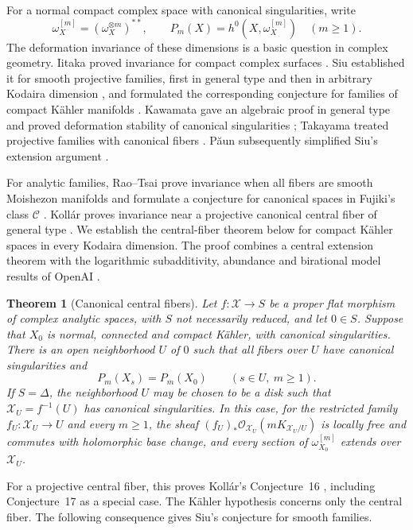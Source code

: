 \documentclass[11pt,a4paper]{article}
\numberwithin{equation}{section}
\newtheorem{maintheorem}{Theorem}
\theoremstyle{definition}
\theoremstyle{remark}
\newcommand{\OO}{\mathcal O}\newcommand{\cX}{\mathcal X}
\begin{document}
For a normal compact complex space with canonical singularities, write
\[
 \omega_X^{[m]}=(\omega_X^{\otimes m})^{**},\qquad
 P_m(X)=h^0(X,\omega_X^{[m]})\quad(m\ge1).
\]
The deformation invariance of these dimensions is a basic question in
complex geometry. Iitaka proved invariance for compact complex surfaces
\cite{Iitaka1970}. Siu established it for smooth projective families,
first in general type and then in arbitrary Kodaira dimension
\cite{Siu1998,Siu2002}, and formulated the corresponding conjecture for
families of compact Kähler manifolds
\cite[Conjecture~0.4]{Siu2002}. Kawamata gave an algebraic proof in
general type and proved deformation stability of canonical singularities
\cite{Kawamata1999}; Takayama treated projective families with canonical
fibers \cite{Takayama2007}. Păun subsequently simplified Siu's extension
argument \cite{Paun2007}.

For analytic families, Rao--Tsai prove invariance when all fibers are
smooth Moishezon manifolds \cite[Theorem~1.2\textup{(i)}]{RaoTsai2022}
and formulate a conjecture for canonical spaces in Fujiki's class
$\mathcal C$ \cite[Conjecture~1.10]{RaoTsai2022}. Kollár proves
invariance near a projective canonical central fiber of general type
\cite[Theorem~1]{Kollar2021}. We establish the central-fiber theorem
below for compact Kähler spaces in every Kodaira dimension. The proof
combines a central extension theorem with the logarithmic subadditivity,
abundance and birational model results of OpenAI \cite{OAI033,OAI034}.

\begin{maintheorem}[Canonical central fibers]\label{thm:canonical-central}
Let $f:\mathcal X\to S$ be a proper flat morphism of complex
analytic spaces, with $S$ not necessarily reduced, and let $0\in S$.
Suppose that $X_0$ is normal, connected and compact Kähler, with
canonical singularities. There is an open neighborhood $U$ of $0$
such that all fibers over $U$ have canonical singularities and
\[
 P_m(X_s)=P_m(X_0)\qquad(s\in U,\ m\ge1).
\]
If $S=\Delta$, the neighborhood $U$ may be chosen to be a disk
such that $\mathcal X_U=f^{-1}(U)$ has canonical singularities.
In this case, for the restricted family $f_U:\mathcal X_U\to U$
and every $m\ge1$, the sheaf
$(f_U)_*\OO_{\mathcal X_U}(mK_{\mathcal X_U/U})$ is locally free
and commutes with holomorphic base change, and every section of
$\omega_{X_0}^{[m]}$ extends over $\mathcal X_U$.
\end{maintheorem}

For a projective central fiber, this proves Kollár's
Conjecture~16 \cite{Kollar2021}, including Conjecture~17 as a
special case. The Kähler hypothesis concerns only the central fiber.
The following consequence gives Siu's conjecture for smooth families.
\end{document}
